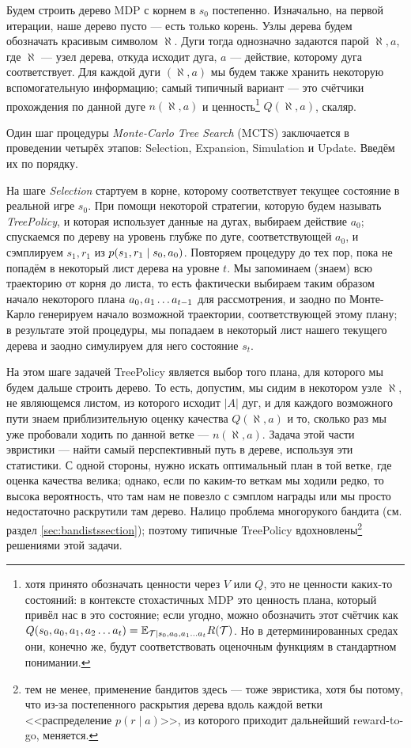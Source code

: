 Будем строить дерево MDP с корнем в $s_0$ постепенно. Изначально, на первой итерации, наше дерево пусто --- есть только корень. Узлы дерева будем обозначать красивым символом $\aleph$. Дуги тогда однозначно задаются парой $\aleph, a$, где $\aleph$ --- узел дерева, откуда исходит дуга, $a$ --- действие, которому дуга соответствует. Для каждой дуги $(\aleph, a)$ мы будем также хранить некоторую вспомогательную информацию; самый типичный вариант --- это счётчики прохождения по данной дуге $n(\aleph, a)$ и ценность\footnote{хотя принято обозначать ценности через $V$ или $Q$, это не ценности каких-то состояний: в контексте стохастичных MDP это ценность плана, который привёл нас в это состояние; если угодно, можно обозначить этот счётчик как $Q(s_0, a_0, a_1, a_2 \dots a_t) \HM= \E_{\Traj \mid s_0, a_0, a_1 \dots a_t} R(\Traj)$. Но в детерминированных средах они, конечно же, будут соответствовать оценочным функциям в стандартном понимании.} $Q(\aleph, a)$, скаляр.

Один шаг процедуры \emph{Monte-Carlo Tree Search} (MCTS) заключается в проведении четырёх этапов: Selection, Expansion, Simulation и Update. Введём их по порядку.

\begin{definition}
На шаге \emph{Selection} стартуем в корне, которому соответствует текущее состояние в реальной игре $s_0$. При помощи некоторой стратегии, которую будем называть \emph{TreePolicy}, и которая использует данные на дугах, выбираем действие $a_0$; спускаемся по дереву на уровень глубже по дуге, соответствующей $a_0$, и сэмплируем $s_1, r_1$ из $p(s_1, r_1 \HM\mid s_0, a_0)$. Повторяем процедуру до тех пор, пока не попадём в некоторый лист дерева на уровне $t$. Мы запоминаем (знаем) всю траекторию от корня до листа, то есть фактически выбираем таким образом начало некоторого плана $a_0, a_1 \HM\dots a_{t-1}$ для рассмотрения, и заодно по Монте-Карло генерируем начало возможной траектории, соответствующей этому плану; в результате этой процедуры, мы попадаем в некоторый лист нашего текущего дерева и заодно симулируем для него состояние $s_t$.
\end{definition}

На этом шаге задачей TreePolicy является выбор того плана, для которого мы будем дальше строить дерево. То есть, допустим, мы сидим в некотором узле $\aleph$, не являющемся листом, из которого исходит $|A|$ дуг, и для каждого возможного пути знаем приблизительную оценку качества $Q(\aleph, a)$ и то, сколько раз мы уже пробовали ходить по данной ветке --- $n(\aleph, a)$. Задача этой части эвристики --- найти самый перспективный путь в дереве, используя эти статистики. С одной стороны, нужно искать оптимальный план в той ветке, где оценка качества велика; однако, если по каким-то веткам мы ходили редко, то высока вероятность, что там нам не повезло с сэмплом награды или мы просто недостаточно раскрутили там дерево. Налицо проблема многорукого бандита (см. раздел \ref{sec:bandistssection}); поэтому типичные TreePolicy вдохновлены\footnote{тем не менее, применение бандитов здесь --- тоже эвристика, хотя бы потому, что из-за постепенного раскрытия дерева вдоль каждой ветки <<распределение $p(r \mid a)$>>, из которого приходит дальнейший reward-to-go, меняется.} решениями этой задачи.

